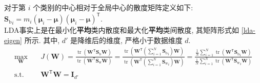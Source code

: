 \documentclass[a4paper]{article}
\numberwithin{equation}{section}
\theoremstyle{definition}
\def \transposed {\mathsf{T}}
\def \muBold {\bm{\mu}}
\def \Sw {\mathbf{S}_{\operatorname{w}}}
\def \Sb {\mathbf{S}_{\operatorname{b}}}
\def \I {\mathbf{I}}
\def \W {\mathbf{W}}
\newcommand\sbr[1]{\left( #1 \right)}
\newcommand\tr[1]{\operatorname{tr}\sbr{#1}}
\begin{document}
\begin{enumerate}
{              对于第 $i$ 个类别的中心相对于全局中心的散度矩阵定义如下:
              ${\Sb}_i = m_i (\muBold_i - \muBold) (\muBold_i - \muBold)^\transposed.$}\\
          LDA事实上是在最小化\textbf{平均}类内散度和最大化\textbf{平均}类间散度, 其矩阵形式如 \eqref{lda-eigen} 所示. 其中, $d'$ 是降维后的维度, 严格小于数据维度 $d$.
          \begin{equation}
              \begin{aligned}
                  \max_{\W} \quad     & J(\W) = \frac{\tr{\W^\transposed \Sb \W}}{\tr{\W^\transposed \Sw \W}} = \frac{\tr{\W^\transposed \sbr{\sum_{i=1}^{N} {\Sb}_i} \W}}{\tr{\W^\transposed \sbr{\sum_{i=1}^{N} {\Sw}_i} \W}} = \frac{\frac{1}{N} \sum_{i=1}^{N} \tr{\W^\transposed {\Sb}_i \W}}{\frac{1}{N} \sum_{i=1}^{N} \tr{\W^\transposed {\Sw}_i \W}} \\
                  \mathrm{s.t.} \quad & \W^\transposed \W = \I_{d'}
              \end{aligned}
              \label{lda-eigen}
          \end{equation}


\end{enumerate}
\end{document}
